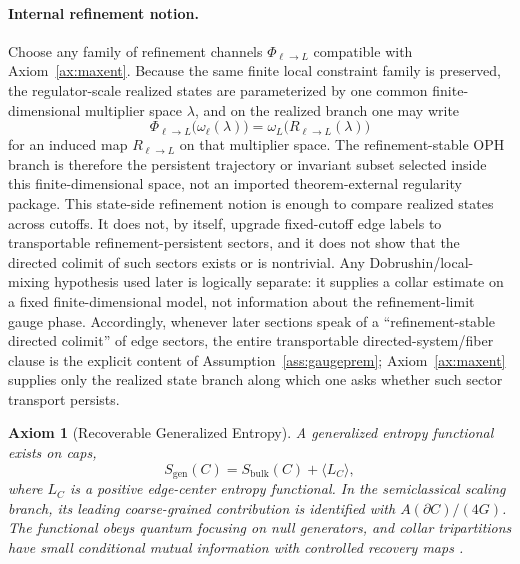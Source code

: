 \documentclass[11pt]{article}
\newtheorem{axiom}[theorem]{Axiom}
\begin{document}
\paragraph{Internal refinement notion.}
Choose any family of refinement channels \(\Phi_{\ell\to L}\) compatible with Axiom~\ref{ax:maxent}. Because the same finite local constraint family is preserved, the regulator-scale realized states are parameterized by one common finite-dimensional multiplier space \(\lambda\), and on the realized branch one may write
\[
\Phi_{\ell\to L}\bigl(\omega_{\ell}(\lambda)\bigr)
=
\omega_{L}\!\bigl(R_{\ell\to L}(\lambda)\bigr)
\]
for an induced map \(R_{\ell\to L}\) on that multiplier space. The refinement-stable OPH branch is therefore the persistent trajectory or invariant subset selected inside this finite-dimensional space, not an imported theorem-external regularity package. This state-side refinement notion is enough to compare realized states across cutoffs. It does not, by itself, upgrade fixed-cutoff edge labels to transportable refinement-persistent sectors, and it does not show that the directed colimit of such sectors exists or is nontrivial. Any Dobrushin/local-mixing hypothesis used later is logically separate: it supplies a collar estimate on a fixed finite-dimensional model, not information about the refinement-limit gauge phase. Accordingly, whenever later sections speak of a ``refinement-stable directed colimit'' of edge sectors, the entire transportable directed-system/fiber clause is the explicit content of Assumption~\ref{ass:gaugeprem}; Axiom~\ref{ax:maxent} supplies only the realized state branch along which one asks whether such sector transport persists.

\begin{axiom}[Recoverable Generalized Entropy]\label{ax:entropy}
A generalized entropy functional exists on caps,
\[
S_{\mathrm{gen}}(C)=S_{\mathrm{bulk}}(C)+\langle L_C\rangle,
\]
where \(L_C\) is a positive edge-center entropy functional. In the semiclassical scaling branch, its leading coarse-grained contribution is identified with \(A(\partial C)/(4G)\). The functional obeys quantum focusing on null generators, and collar tripartitions have small conditional mutual information with controlled recovery maps \cite{liebRuskai73,petz86,petz88,fawziRenner15}.
\end{axiom}
\end{document}
